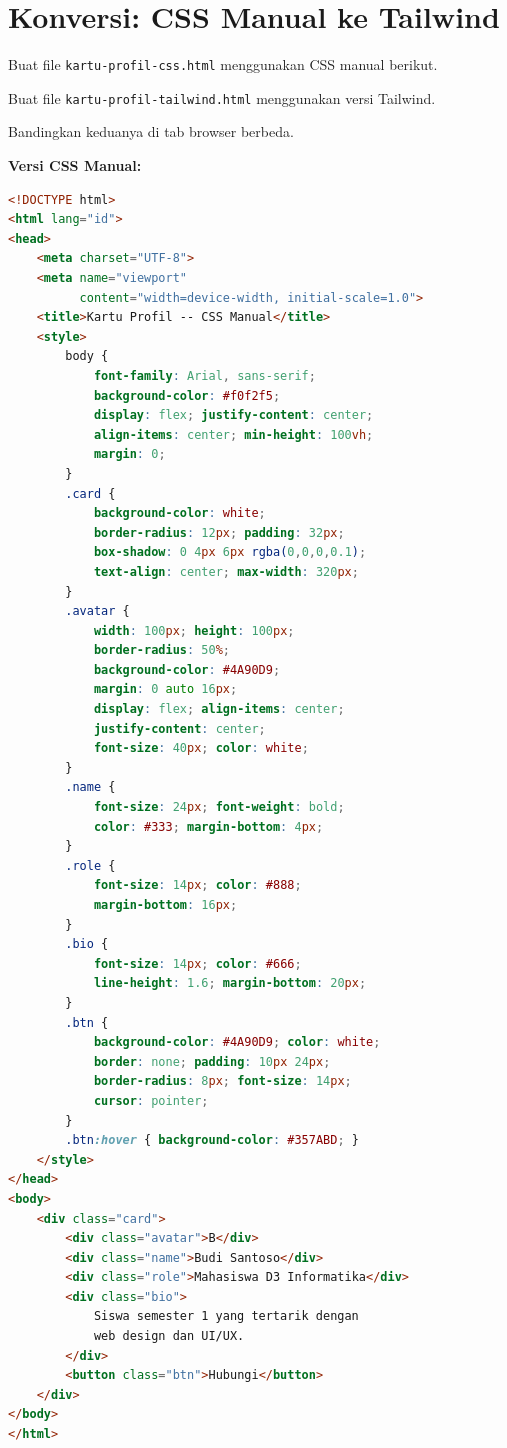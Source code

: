\section{Konversi: CSS Manual ke Tailwind}
\label{sec:12-konversi}

\begin{langkah}
  \item Buat file \texttt{kartu-profil-css.html} menggunakan CSS manual berikut.
  \item Buat file \texttt{kartu-profil-tailwind.html} menggunakan versi Tailwind.
  \item Bandingkan keduanya di tab browser berbeda.
\end{langkah}

\textbf{Versi CSS Manual:}

\begin{lstlisting}[language=HTML, caption={Kartu profil dengan CSS manual}, label={lst:12-kartu-css}]
<!DOCTYPE html>
<html lang="id">
<head>
    <meta charset="UTF-8">
    <meta name="viewport"
          content="width=device-width, initial-scale=1.0">
    <title>Kartu Profil -- CSS Manual</title>
    <style>
        body {
            font-family: Arial, sans-serif;
            background-color: #f0f2f5;
            display: flex; justify-content: center;
            align-items: center; min-height: 100vh;
            margin: 0;
        }
        .card {
            background-color: white;
            border-radius: 12px; padding: 32px;
            box-shadow: 0 4px 6px rgba(0,0,0,0.1);
            text-align: center; max-width: 320px;
        }
        .avatar {
            width: 100px; height: 100px;
            border-radius: 50%;
            background-color: #4A90D9;
            margin: 0 auto 16px;
            display: flex; align-items: center;
            justify-content: center;
            font-size: 40px; color: white;
        }
        .name {
            font-size: 24px; font-weight: bold;
            color: #333; margin-bottom: 4px;
        }
        .role {
            font-size: 14px; color: #888;
            margin-bottom: 16px;
        }
        .bio {
            font-size: 14px; color: #666;
            line-height: 1.6; margin-bottom: 20px;
        }
        .btn {
            background-color: #4A90D9; color: white;
            border: none; padding: 10px 24px;
            border-radius: 8px; font-size: 14px;
            cursor: pointer;
        }
        .btn:hover { background-color: #357ABD; }
    </style>
</head>
<body>
    <div class="card">
        <div class="avatar">B</div>
        <div class="name">Budi Santoso</div>
        <div class="role">Mahasiswa D3 Informatika</div>
        <div class="bio">
            Siswa semester 1 yang tertarik dengan
            web design dan UI/UX.
        </div>
        <button class="btn">Hubungi</button>
    </div>
</body>
</html>
\end{lstlisting}

